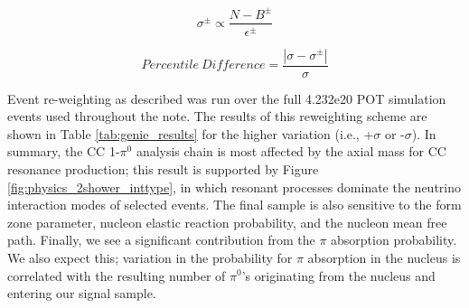 \begin{equation} \label{eq:genie_xsec_var}
  \sigma^\pm \propto \frac{N - B^\pm}{\epsilon^\pm} 
\end{equation}

\begin{equation} \label{eq:genie_xsec_percentdiff}
  Percentile\ Difference = \frac{| \sigma - \sigma^\pm |}{\sigma} 
\end{equation}

\par Event re-weighting as described was run over the full 4.232e20 POT simulation events used throughout the note. The results of this reweighting scheme are shown in Table \ref{tab:genie_results} for the higher variation (i.e., +$\sigma$ or -$\sigma$). In summary, the CC 1-$\pi^0$ analysis chain is most affected by the axial mass for CC resonance production;  this result is supported by Figure \ref{fig:physics_2shower_inttype}, in which resonant processes dominate the neutrino interaction modes of selected events. The final sample is also sensitive to the form zone parameter, nucleon elastic reaction probability, and the nucleon mean free path.   Finally, we see a significant contribution from the $\pi$ absorption probability. We also expect this; variation in the probability for $\pi$ absorption in the nucleus is correlated with the resulting number of $\pi^0$'s originating from the nucleus and entering our signal sample.  


